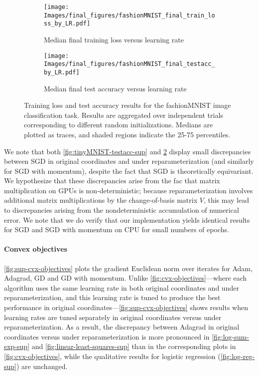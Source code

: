 \begin{figure*}[h!]
    \centering
    \begin{subfigure}[t]{0.45\textwidth}
        \centering
        \texttt{[image: Images/final\_figures/fashionMNIST\_final\_train\_loss\_by\_LR.pdf]}
        \caption{Median final training loss versus learning rate}
        \label{fig:fashionMNIST-loss-sup}
    \end{subfigure}
    \hspace{0.05\textwidth} %
    \begin{subfigure}[t]{0.45\textwidth}
        \centering
        \texttt{[image: Images/final\_figures/fashionMNIST\_final\_testacc\_by\_LR.pdf]}
        \caption{Median final test accuracy versus learning rate}
        \label{fig:fashionMNIST-testacc-sup}
    \end{subfigure}
    \caption{Training loss and test accuracy results for the fashionMNIST image classification task. Results are aggregated over independent trials corresponding to different random initializations. Medians are plotted as traces, and shaded regions indicate the 25-75 percentiles.
    }\label{fig:fashionMNIST-sup}
\end{figure*}

We note that both \cref{fig:tinyMNIST-testacc-sup} and \cref{fig:fashionMNIST-testacc-sup} display small discrepancies between SGD in original coordinates and under reparameterization (and similarly for SGD with momentum), despite the fact that SGD is theoretically equivariant. We hypothesize that these discrepancies arise from the fac that matrix multiplication on GPUs is non-deterministic; because reparameterization involves additional matrix multiplications by the change-of-basis matrix $V$, this may lead to discrepancies arising from the nondeterministic accumulation of numerical error. We note that we do verify that our implementation yields identical results for SGD and SGD with momentum on CPU for small numbers of epochs.

\paragraph{Convex objectives} \cref{fig:sup-cvx-objectives} plots the gradient Euclidean norm over iterates for Adam, Adagrad, GD and GD with momentum. Unlike \cref{fig:cvx-objectives}---where each algorithm uses the same learning rate in both original coordinates and under reparameterization, and this learning rate is tuned to produce the best performance in original coordinates---\cref{fig:sup-cvx-objectives} shows results when learning rates are tuned separately in original coordinates versus under reparameterization. As a result, the discrepancy between Adagrad in original coordinates versus under reparameterization is more pronounced in \cref{fig:log-sum-exp-sup} and \cref{fig:linear-least-squares-sup} than in the corresponding plots in \cref{fig:cvx-objectives}, while the qualitative results for logistic regression (\cref{fig:log-reg-sup}) are unchanged.


